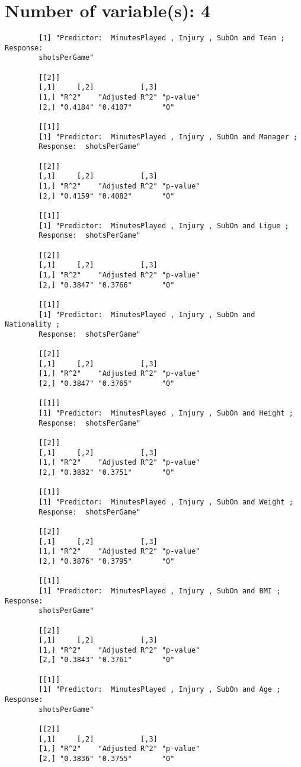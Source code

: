 \documentclass[12pt]{article}
\begin{document}
	\section{Number of variable(s): 4}
	\begin{verbatim}
		[1] "Predictor:  MinutesPlayed , Injury , SubOn and Team ; Response:  
		shotsPerGame"
		
		[[2]]
		[,1]     [,2]           [,3]     
		[1,] "R^2"    "Adjusted R^2" "p-value"
		[2,] "0.4184" "0.4107"       "0"      
		
		[[1]]
		[1] "Predictor:  MinutesPlayed , Injury , SubOn and Manager ; 
		Response:  shotsPerGame"
		
		[[2]]
		[,1]     [,2]           [,3]     
		[1,] "R^2"    "Adjusted R^2" "p-value"
		[2,] "0.4159" "0.4082"       "0"      
		
		[[1]]
		[1] "Predictor:  MinutesPlayed , Injury , SubOn and Ligue ; 
		Response:  shotsPerGame"
		
		[[2]]
		[,1]     [,2]           [,3]     
		[1,] "R^2"    "Adjusted R^2" "p-value"
		[2,] "0.3847" "0.3766"       "0"      
		
		[[1]]
		[1] "Predictor:  MinutesPlayed , Injury , SubOn and Nationality ; 
		Response:  shotsPerGame"
		
		[[2]]
		[,1]     [,2]           [,3]     
		[1,] "R^2"    "Adjusted R^2" "p-value"
		[2,] "0.3847" "0.3765"       "0"      
		
		[[1]]
		[1] "Predictor:  MinutesPlayed , Injury , SubOn and Height ; 
		Response:  shotsPerGame"
		
		[[2]]
		[,1]     [,2]           [,3]     
		[1,] "R^2"    "Adjusted R^2" "p-value"
		[2,] "0.3832" "0.3751"       "0"      
		
		[[1]]
		[1] "Predictor:  MinutesPlayed , Injury , SubOn and Weight ; 
		Response:  shotsPerGame"
		
		[[2]]
		[,1]     [,2]           [,3]     
		[1,] "R^2"    "Adjusted R^2" "p-value"
		[2,] "0.3876" "0.3795"       "0"      
		
		[[1]]
		[1] "Predictor:  MinutesPlayed , Injury , SubOn and BMI ; Response:  
		shotsPerGame"
		
		[[2]]
		[,1]     [,2]           [,3]     
		[1,] "R^2"    "Adjusted R^2" "p-value"
		[2,] "0.3843" "0.3761"       "0"      
		
		[[1]]
		[1] "Predictor:  MinutesPlayed , Injury , SubOn and Age ; Response:  
		shotsPerGame"
		
		[[2]]
		[,1]     [,2]           [,3]     
		[1,] "R^2"    "Adjusted R^2" "p-value"
		[2,] "0.3836" "0.3755"       "0"      
		

\end{verbatim}
\end{document}
